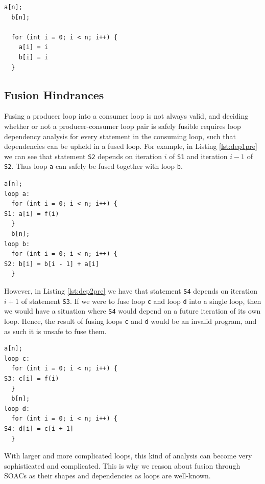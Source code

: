 \documentclass[11pt,bibliography=totocnumbered]{article}
\begin{document}
\begin{lstlisting}[caption=Post-fusion,label={lst:horipost}]
  a[n];
  b[n];
  
  for (int i = 0; i < n; i++) {
    a[i] = i
    b[i] = i  
  }
\end{lstlisting}

\subsection{Fusion Hindrances}
Fusing a producer loop into a consumer loop is not always valid, and deciding whether or not a producer-consumer loop pair is safely fusible requires loop dependency analysis for every statement 
 in the consuming loop, such that dependencies can be upheld in a fused loop.
 For example, in Listing \ref{lst:dep1pre} we can see that statement \texttt{S2} depends on iteration $i$ of \texttt{S1} and iteration $i-1$ of \texttt{S2}. Thus loop \texttt{a} can safely be fused together
 with loop \texttt{b}.

\begin{lstlisting}[caption=Example dependencies,label={lst:dep1pre}]
  a[n];
loop a:
  for (int i = 0; i < n; i++) {
S1: a[i] = f(i)
  }
  b[n];
loop b:
  for (int i = 0; i < n; i++) {
S2: b[i] = b[i - 1] + a[i]  
  }
\end{lstlisting}
However, in Listing \ref{lst:dep2pre} we have that statement \texttt{S4} depends on iteration $i+1$ of statement \texttt{S3}. If we were to fuse loop \texttt{c} and loop \texttt{d} into a single loop, then we would
 have a situation where \texttt{S4} would depend on a future iteration of its own loop. Hence, the result of fusing loops \texttt{c} and \texttt{d} would be an invalid program, and as such it is unsafe to fuse them.
\begin{lstlisting}[caption=Example dependencies,label={lst:dep2pre}]
  a[n];
loop c:
  for (int i = 0; i < n; i++) {
S3: c[i] = f(i)
  }
  b[n];
loop d:
  for (int i = 0; i < n; i++) {
S4: d[i] = c[i + 1]  
  }
\end{lstlisting}
With larger and more complicated loops, this kind of analysis can become very sophisticated and complicated. This is why we reason about fusion through SOACs as their shapes and dependencies as loops
 are well-known.
\end{document}
